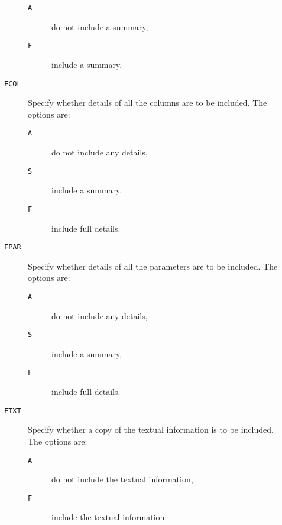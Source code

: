 \documentclass[twoside,11pt]{starlink}
\begin{document}
\begin{description}
\begin{description}
\begin{description}
      \item[ \texttt{A} ] do not include a summary,

      \item[ \texttt{F} ] include a summary.

    \end{description}

    \item[ \texttt{FCOL} ] Specify whether details of all the columns are
     to be included. The options are:

    \begin{description}

      \item[ \texttt{A} ] do not include any details,

      \item[ \texttt{S} ] include a summary,

      \item[ \texttt{F} ] include full details.

    \end{description}

    \item[ \texttt{FPAR} ] Specify whether details of all the parameters are
     to be included. The options are:

    \begin{description}

      \item[ \texttt{A} ] do not include any details,

      \item[ \texttt{S} ] include a summary,

      \item[ \texttt{F} ] include full details.

    \end{description}

    \item[ \texttt{FTXT} ] Specify whether a copy of the textual information
     is to be included. The options are:

    \begin{description}

      \item[ \texttt{A} ] do not include the textual information,

      \item[ \texttt{F} ] include the textual information.

    \end{description}


\end{description}
\end{description}
\end{document}
